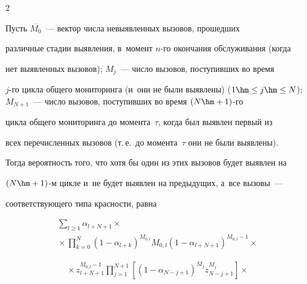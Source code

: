 \begin{multicols}{2}
  


  Пусть $\overline{M_0}$~--- вектор числа невыявленных вызовов, прошедших 


различные стадии выявления, в~момент $n$-го окончания обслуживания (когда 


нет выявленных вызовов); $M_j$~--- число вызовов, поступивших во время  


$j$-го цикла общего мониторинга (и~они не были выявлены) ($1\hm\leq j\hm\leq 


N$); $M_{N+1}$~--- число вызовов, поступивших во время $(N\hm+1)$-го 


цикла общего мониторинга до момента~$\tau$, когда был выявлен первый из 


всех перечисленных вызовов (т.\,е.\ до момента~$\tau$ они не были выявлены). 


Тогда вероятность того, что хотя бы один из этих вызовов будет выявлен на 


$(N\hm+1)$-м цикле и~не будет выявлен на предыдущих, а~все вызовы~--- 


соответствующего типа красности, равна 





\vspace*{-2pt}





\noindent


  \begin{multline*}


  \sum\limits_{l\geq1} \alpha_{l+N+1}\times{}\\


  {}\times \prod\limits^N_{k=0} \left(1-


\alpha_{l+k}\right)^{M_{0,l}}


M_{0,l}\left( 1-\alpha_{l+N+1}\right)^{M_{0,l}-1}\times{}


\end{multline*}





\noindent


 \begin{multline*}


{}\times  


z_{l+N+1}^{M_{0,l}-1} \prod\limits_{j=1}^{N+1}


  \left[(1-\alpha_{N-j+1})^{M_j} z^{M_j}_{N-j+1}\right] \times{}\\



\end{multline*}
\end{multicols}
